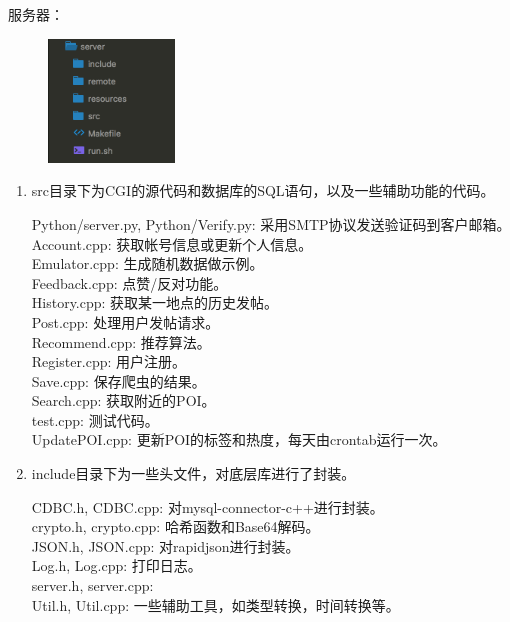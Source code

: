 \documentclass[UTF8]{article}
\begin{document}
服务器：
\begin{figure}[H]
    \center
    \includegraphics[width=0.3\textwidth]{images/server1.png}
\end{figure}
\begin{enumerate}
    \item src目录下为CGI的源代码和数据库的SQL语句，以及一些辅助功能的代码。\\
    \begin{tcolorbox}[colback=white]
        Python/server.py, Python/Verify.py: 采用SMTP协议发送验证码到客户邮箱。\\
        Account.cpp: 获取帐号信息或更新个人信息。\\
        Emulator.cpp: 生成随机数据做示例。\\
        Feedback.cpp: 点赞/反对功能。\\
        History.cpp: 获取某一地点的历史发帖。\\
        Post.cpp: 处理用户发帖请求。\\
        Recommend.cpp: 推荐算法。\\
        Register.cpp: 用户注册。\\
        Save.cpp: 保存爬虫的结果。\\
        Search.cpp: 获取附近的POI。\\
        test.cpp: 测试代码。\\
        UpdatePOI.cpp: 更新POI的标签和热度，每天由crontab运行一次。
    \end{tcolorbox}

    \item include目录下为一些头文件，对底层库进行了封装。\\
    \begin{tcolorbox}[colback=white]
        CDBC.h, CDBC.cpp: 对mysql-connector-c++进行封装。\\
        crypto.h, crypto.cpp: 哈希函数和Base64解码。\\
        JSON.h, JSON.cpp: 对rapidjson进行封装。\\
        Log.h, Log.cpp: 打印日志。\\
        server.h, server.cpp: \\
        Util.h, Util.cpp: 一些辅助工具，如类型转换，时间转换等。
    \end{tcolorbox}


\end{enumerate}
\end{document}
